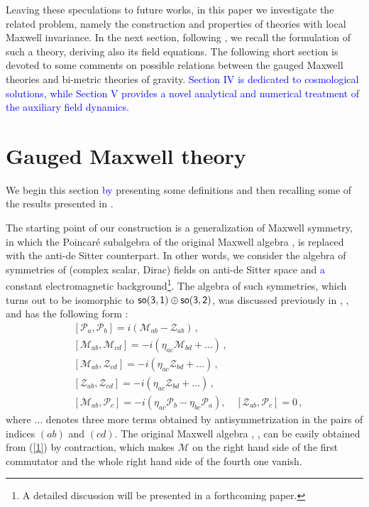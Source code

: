 \documentclass [prd,reprint,eqsecnum,nofootinbib]  {revtex4-1}
\begin{document}
Leaving these speculations to future works, in this paper we
investigate the related problem, namely the construction and
properties of theories with local Maxwell invariance. In the next
section, following \cite{Durka:2011nf}, we recall the formulation of
such a theory, deriving also its field equations. The following
short section is devoted to some comments on possible relations
between the gauged Maxwell theories and bi-metric theories of
gravity. \textcolor{blue}{Section IV is dedicated to cosmological solutions, while Section V provides a novel analytical and numerical treatment of the auxiliary field dynamics.}

\section{Gauged Maxwell theory}

We begin this section \textcolor{blue}{by} presenting some definitions and then recalling
some of the results presented in \cite{Durka:2011nf}.

The starting point of our construction is a generalization of
Maxwell symmetry, in which the Poincar\'e subalgebra of the original
Maxwell algebra \cite{Bacry:1970ye}, \cite{Schrader:1972zd} is
replaced with the anti-de Sitter counterpart. In other words, we
consider the algebra of symmetries of (complex scalar, Dirac) fields
on anti-de Sitter space and \textcolor{blue}{a} constant electromagnetic
background\footnote{A detailed discussion will be presented in a
forthcoming paper.}. The algebra of such symmetries, which turns out
to be isomorphic to $\sf{so}(3,1)\oplus\sf{so}(3,2)$, was discussed
previously in \cite{Soroka:2006aj}, \cite{Bonanos:2010fw},
\cite{Lukierski:2010dy} and has the following form
\cite{Durka:2011nf}:
\begin{align}
&[\mathcal{P}_{a},\mathcal{P}_{b}]=i(\mathcal{M}_{ab}-\mathcal{Z}_{ab})\,
,\nonumber\\
&[\mathcal{M}_{ab},\mathcal{M}_{cd}]=-i(\eta_{ac}\mathcal{M}_{bd}+\ldots)\, ,\nonumber\\
&[\mathcal{M}_{ab},\mathcal{Z}_{cd}]=-i(\eta_{ac}\mathcal{Z}_{bd}+\ldots)\,,\nonumber\\
&[\mathcal{Z}_{ab},\mathcal{Z}_{cd}]=-i(\eta_{ac}\mathcal{Z}_{bd}+\ldots)\, ,\nonumber\\
&[\mathcal{M}_{ab},\mathcal{P}_c]=-i(\eta_{ac}\mathcal{P}_{b}-\eta_{bc}\mathcal{P}_{a}),\quad
[\mathcal{Z}_{ab},\mathcal{P}_{c}]=0\,,\label{1}
\end{align}
where $\ldots$ denotes three more terms obtained by
antisymmetrization in the pairs of indices $(ab)$ and $(cd)$. The
original Maxwell algebra \cite{Soroka:2006aj},
\cite{Bonanos:2010fw}, \cite{Lukierski:2010dy} can be easily
obtained from (\ref{1}) by contraction, which makes $\mathcal{M}$ on
the right hand side of the first commutator and the whole right hand
side of the fourth one vanish.
\end{document}
